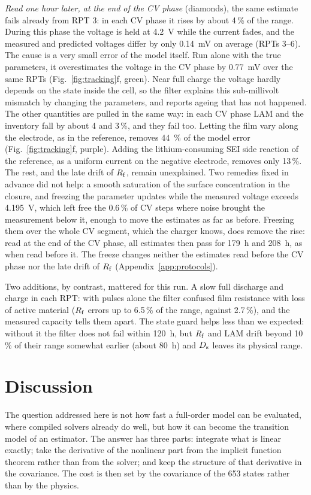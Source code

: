 \documentclass[journal]{IEEEtran}
\newcommand{\LAM}{\mathrm{LAM}}\newcommand{\LLI}{\mathrm{LLI}}\newcommand{\phipl}{\phi_{\mathrm{pl}}}
\begin{document}
\emph{Read one hour later, at the end of the CV phase} (diamonds), the same estimate fails already from RPT 3: in each CV phase it rises by about 4\,\% of the range. During this phase the voltage is held at \SI{4.2}{\volt} while the current fades, and the measured and predicted voltages differ by only \SI{0.14}{\milli\volt} on average (RPTs 3--6). The cause is a very small error of the model itself. Run alone with the true parameters, it overestimates the voltage in the CV phase by \SI{0.77}{\milli\volt} over the same RPTs (Fig.~\ref{fig:tracking}f, green). Near full charge the voltage hardly depends on the state inside the cell, so the filter explains this sub-millivolt mismatch by changing the parameters, and reports ageing that has not happened. The other quantities are pulled in the same way: in each CV phase $\LAM$ and the inventory fall by about 4 and 3\,\%, and they fail too. Letting the film vary along the electrode, as in the reference, removes \SI{44}{\percent} of the model error (Fig.~\ref{fig:tracking}f, purple). Adding the lithium-consuming SEI side reaction of the reference, as a uniform current on the negative electrode, removes only 13\,\%. The rest, and the late drift of $R_{\mathrm{f}}$, remain unexplained. Two remedies fixed in advance did not help: a smooth saturation of the surface concentration in the closure, and freezing the parameter updates while the measured voltage exceeds \SI{4.195}{\volt}, which left free the 0.6\,\% of CV steps where noise brought the measurement below it, enough to move the estimates as far as before. Freezing them over the whole CV segment, which the charger knows, does remove the rise: read at the end of the CV phase, all estimates then pass for \SI{179}{\hour} and \SI{208}{\hour}, as when read before it. The freeze changes neither the estimates read before the CV phase nor the late drift of $R_{\mathrm{f}}$ (Appendix~\ref{app:protocols}).

Two additions, by contrast, mattered for this run. A slow full discharge and charge in each RPT: with pulses alone the filter confused film resistance with loss of active material ($R_{\mathrm{f}}$ errors up to 6.5\,\% of the range, against 2.7\,\%), and the measured capacity tells them apart. The state guard helps less than we expected: without it the filter does not fail within \SI{120}{\hour}, but $R_{\mathrm{f}}$ and $\LAM$ drift beyond 10\,\% of their range somewhat earlier (about \SI{80}{\hour}) and $D_{\mathrm{s}}$ leaves its physical range.

\section{Discussion}
The question addressed here is not how fast a full-order model can be evaluated, where compiled solvers already do well\cite{petlion,pybamm}, but how it can become the transition model of an estimator. The answer has three parts: integrate what is linear exactly; take the derivative of the nonlinear part from the implicit function theorem rather than from the solver; and keep the structure of that derivative in the covariance. The cost is then set by the covariance of the 653 states rather than by the physics.
\end{document}
